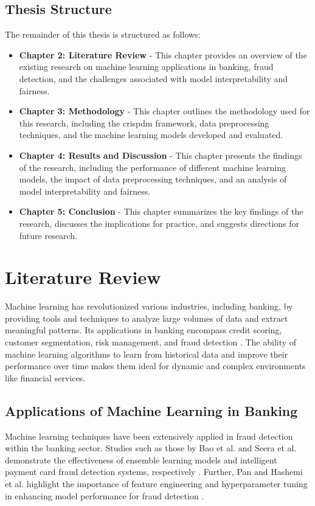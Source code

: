 \documentclass[12pt,a4paper]{report}
\begin{document}
\clearpage

\section{Thesis Structure}
The remainder of this thesis is structured as follows:

\begin{itemize}
    \item \textbf{Chapter 2: Literature Review} - This chapter provides an overview of the existing research on machine learning applications in banking, fraud detection, and the challenges associated with model interpretability and fairness.
    \item \textbf{Chapter 3: Methodology} - This chapter outlines the methodology used for this research, including the \acrshort{crispdm} framework, data preprocessing techniques, and the machine learning models developed and evaluated.
    \item \textbf{Chapter 4: Results and Discussion} - This chapter presents the findings of the research, including the performance of different machine learning models, the impact of data preprocessing techniques, and an analysis of model interpretability and fairness.
    \item \textbf{Chapter 5: Conclusion} - This chapter summarizes the key findings of the research, discusses the implications for practice, and suggests directions for future research.
\end{itemize}



\chapter{Literature Review}
Machine learning has revolutionized various industries, including banking, by providing tools and techniques to analyze large volumes of data and extract meaningful patterns. Its applications in banking encompass credit scoring, customer segmentation, risk management, and fraud detection \citep[p. 3034]{bao2020detecting, pan2024machine, hashemi2022fraud}. The ability of machine learning algorithms to learn from historical data and improve their performance over time makes them ideal for dynamic and complex environments like financial services.

\section{Applications of Machine Learning in Banking}
Machine learning techniques have been extensively applied in fraud detection within the banking sector. Studies such as those by Bao et al. and Seera et al. demonstrate the effectiveness of ensemble learning models and intelligent payment card fraud detection systems, respectively \citep{bao2020detecting, seera2024intelligent}. Further, Pan and Hashemi et al. highlight the importance of feature engineering and hyperparameter tuning in enhancing model performance for fraud detection \citep{pan2024machine, hashemi2022fraud}.\\
\end{document}
